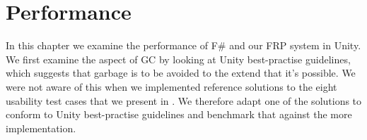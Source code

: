 \section{Performance}
In this chapter we examine the performance of F\# and our \gls{FRP} system in Unity. We first examine the aspect of \gls{GC} by looking at Unity best-practise guidelines, which suggests that garbage is to be avoided to the extend that it's possible. We were not aware of this when we implemented reference solutions to the eight usability test cases that we present in . We therefore adapt one of the solutions to conform to Unity best-practise guidelines and benchmark that against the more  implementation.


